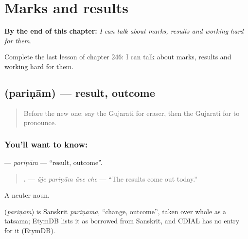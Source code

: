 
\chapter{Marks and results}
\label{ch:gu-marks-and-results}

\begin{chapteropening}
\textbf{By the end of this chapter:} \emph{I can talk about marks, results and working hard for them.}

Complete the last lesson of chapter 246: I can talk about marks, results and working hard for them.
\end{chapteropening}

\section[\texorpdfstring{\gu{પરિણામ} (pariṇām)}{પરિણામ (pariṇām)}]{ (pariṇām) — result, outcome}

\label{lesson:GU-C246-parinam}



\begin{quote}
Before the new one: say the Gujarati for eraser, then the Gujarati for to pronounce.
\end{quote}

\subsection*{You'll want to know: }
\textbf{} — \emph{pariṇām} — \textquotedblleft{}result, outcome\textquotedblright{}.

\begin{quote}
\textbf{   .} — \emph{āje pariṇām āve che} — \textquotedblleft{}The results come out today.\textquotedblright{}
\end{quote}

A neuter noun.

\begin{cousinweb}
\textbf{} (\emph{pariṇām}) is Sanskrit \emph{pariṇāma}, \textquotedblleft{}change, outcome\textquotedblright{}, taken over whole as a tatsama; EtymDB lists it as borrowed from Sanskrit, and CDIAL has no entry for it (EtymDB).
\end{cousinweb}

